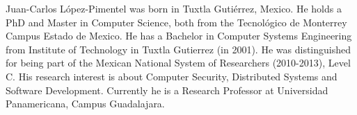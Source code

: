 \ifCLASSOPTIONcaptionsoff
  \newpage
\fi








\nocite{*}

% 



\begin{IEEEbiographynophoto}{Juan-Carlos L\'opez-Pimentel}
was born in Tuxtla Guti\'errez, Mexico. He holds a PhD and Master in Computer Science, both from the Tecnológico de Monterrey Campus Estado de Mexico. He has a Bachelor in Computer Systems Engineering from Institute of Technology in Tuxtla Gutierrez (in 2001). He was distinguished for being part of the Mexican National System of Researchers (2010-2013), Level C. His research interest is about Computer Security, Distributed Systems and Software Development. Currently he is a Research Professor at Universidad Panamericana, Campus Guadalajara.
\end{IEEEbiographynophoto}


